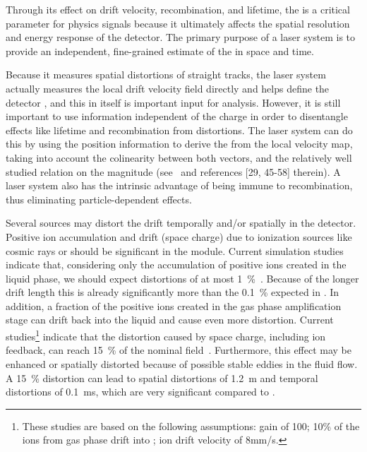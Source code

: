 Through its effect on drift velocity, recombination, and lifetime, the \efield is a critical parameter for physics signals because it ultimately affects the spatial resolution and energy response of the detector. The primary purpose of a laser system is to provide an independent, fine-grained estimate of the \efield in space and time. 

Because it measures spatial distortions of straight tracks, the laser system actually measures the local drift velocity field directly and helps define the detector , and this in itself is important input for  analysis. 
However, it is still important to use information independent of the charge in order to disentangle effects like lifetime and recombination from \efield distortions. The laser system can do this by using the position information to derive the \efield from the local velocity map, taking into account the colinearity between both vectors, and the relatively well studied relation on the magnitude (see~\cite{Li:2015rqa} and references [29, 45-58] therein). A laser system also has the intrinsic advantage of being immune to recombination, thus eliminating particle-dependent effects.  

Several sources may distort the drift \efield temporally and/or spatially in the detector. Positive ion accumulation and drift (space charge) due to ionization sources like cosmic rays or  should be significant in the    module. Current simulation studies indicate that, considering only the accumulation of positive ions created in the liquid phase, we should expect \efield distortions of at most \SI{1}{\%}~\cite{bib:mooney2018}. Because of the longer drift length this is already significantly more than the \SI{0.1}{\%} expected in . In addition, a fraction of the positive ions created in the gas phase amplification stage can drift back into the liquid and cause even more distortion. Current studies\footnote{These studies are based on the following assumptions:  gain of 100; 10\% of the ions from gas phase drift into \lar; ion drift velocity of 8mm/s.} indicate that the \efield distortion caused by space charge, including ion feedback, can reach \SI{15}{\%} of the nominal field~\cite{bib:boyu2018}.
Furthermore, this effect may be enhanced or spatially distorted because of possible stable eddies in the  fluid flow. A \SI{15}{\%} distortion can lead to spatial distortions of 1.2~m and temporal distortions of 0.1~ms, which are very significant compared to . 

